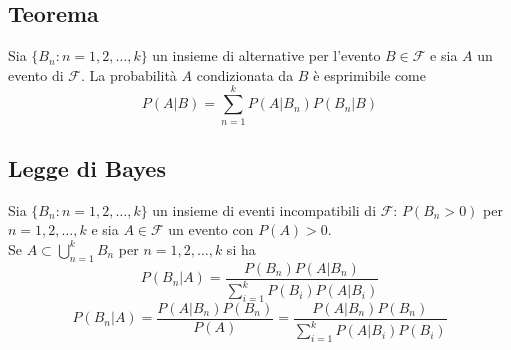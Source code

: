 \begin{multicols*}{2}
\subsection*{Teorema}
Sia $\{B_n : n = 1,2,\dots,k\}$ un insieme di alternative per l'evento $B \in \mathscr{F}$ e
sia $A$ un evento di $\mathscr{F}$. La probabilità $A$ condizionata da $B$ è esprimibile come
$$
P(A|B) = \sum_{n=1}^{k}P(A | B_n)P(B_n|B)
$$

\subsection*{Legge di Bayes}
Sia $\{B_n : n = 1,2,\dots,k\}$ un insieme di eventi incompatibili di $\mathscr{F}$: 
$P(B_n > 0)$ per $n = 1,2,\dots,k$ e sia $A \in \mathscr{F}$ un evento con $P(A) > 0$.\\
Se $\displaystyle A \subset \bigcup_{n=1}^{k} B_n$ per $n = 1,2,\dots,k$ si ha
$$
P(B_n|A) = \frac{P(B_n)P(A|B_n)}{\displaystyle \sum_{i=1}^{k}P(B_i)P(A|B_i)}
$$
$$
P(B_n|A) = \frac{P(A|B_n)P(B_n)}{P(A)} = \frac{P(A|B_n)P(B_n)}{\displaystyle 
\sum_{i=1}^{k}P(A|B_i)P(B_i)}
$$

\end{multicols*}